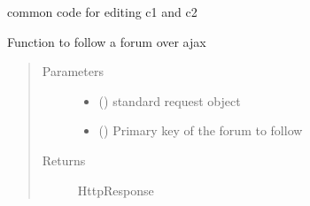 \documentclass[letterpaper,10pt,english]{sphinxmanual}
\begin{document}
\begin{fulllineitems}
\label{\detokenize{forums:forums.views.comment2_edit}}
\end{fulllineitems}


\begin{fulllineitems}
\label{\detokenize{forums:forums.views.comment_edit_common}}
common code for editing c1 and c2

\end{fulllineitems}


\begin{fulllineitems}
\label{\detokenize{forums:forums.views.follow_forum_ajax}}
Function to follow a forum over ajax
\begin{quote}\begin{description}
\item[{Parameters}] \leavevmode\begin{itemize}
\item {} 
 () \textendash{} standard request object

\item {} 
 () \textendash{} Primary key of the forum to follow

\end{itemize}

\item[{Returns}] \leavevmode
HttpResponse

\end{description}\end{quote}

\end{fulllineitems}
\end{document}
